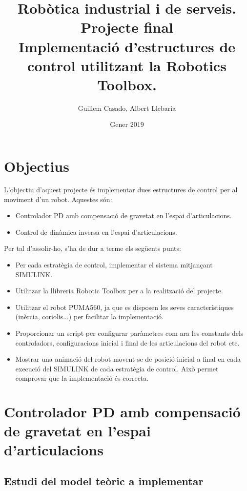 \documentclass[]{article}
\title{Robòtica industrial i de serveis. \\ Projecte final \\ Implementació d'estructures de control utilitzant la Robotics Toolbox. }
\author{Guillem Casado, Albert Llebaria}
\date{Gener 2019}
\begin{document}
\maketitle

\begin{abstract}
\end{abstract}


\section{Objectius}
L'objectiu d'aquest projecte és implementar dues estructures de control per al moviment d'un robot. Aquestes són: 

\begin{itemize}
\item Controlador PD amb compensació de gravetat en l'espai d'articulacions. 
\item Control de dinàmica inversa en l'espai d'articulacions.
\end{itemize}

Per tal d'assolir-ho, s'ha de dur a terme els següents punts:

\begin{itemize}
\item Per cada estratègia de control, implementar el sistema mitjançant SIMULINK. 
\item Utilitzar la llibreria Robotic Toolbox per a la realització del projecte. 
\item Utilitzar el robot PUMA560, ja que es disposen les seves característiques (inèrcia, coriolis...) per facilitar la implementació. 
\item Proporcionar un script per configurar paràmetres com ara les constants dels controladors, configuracions inicial i final de les articulacions del robot etc.
\item Mostrar una animació del robot movent-se de posició inicial a final en cada execució del SIMULINK de cada estratègia de control. Això permet comprovar que la implementació és correcta. 
\end{itemize}


\section{Controlador PD amb compensació de gravetat en l'espai d'articulacions}

\subsection{Estudi del model teòric a implementar}
\end{document}

